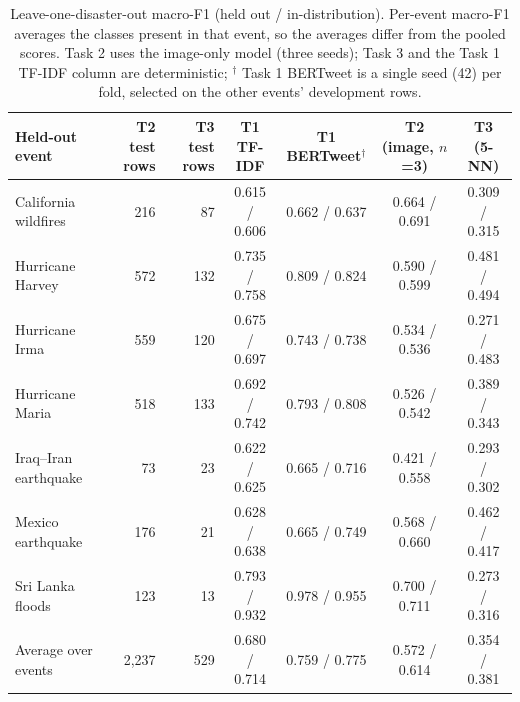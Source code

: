 \documentclass[conference]{IEEEtran}
\begin{document}
\begin{table}[t]
\centering
\caption{Leave-one-disaster-out macro-F1 (held out / in-distribution). Per-event macro-F1 averages the classes present in that event, so the averages differ from the pooled scores. Task 2 uses the image-only model (three seeds); Task 3 and the Task 1 TF-IDF column are deterministic; $^{\dagger}$ Task 1 BERTweet is a single seed (42) per fold, selected on the other events' development rows.}
\label{tab:lodo}
\footnotesize
\begin{tabular}{lrrcccc}
\toprule
Held-out event & T2 test rows & T3 test rows & T1 TF-IDF & T1 BERTweet$^{\dagger}$ & T2 (image, $n$=3) & T3 (5-NN) \\
\midrule
California wildfires & 216 & 87 & 0.615 / 0.606 & 0.662 / 0.637 & 0.664 / 0.691 & 0.309 / 0.315 \\
Hurricane Harvey & 572 & 132 & 0.735 / 0.758 & 0.809 / 0.824 & 0.590 / 0.599 & 0.481 / 0.494 \\
Hurricane Irma & 559 & 120 & 0.675 / 0.697 & 0.743 / 0.738 & 0.534 / 0.536 & 0.271 / 0.483 \\
Hurricane Maria & 518 & 133 & 0.692 / 0.742 & 0.793 / 0.808 & 0.526 / 0.542 & 0.389 / 0.343 \\
Iraq--Iran earthquake & 73 & 23 & 0.622 / 0.625 & 0.665 / 0.716 & 0.421 / 0.558 & 0.293 / 0.302 \\
Mexico earthquake & 176 & 21 & 0.628 / 0.638 & 0.665 / 0.749 & 0.568 / 0.660 & 0.462 / 0.417 \\
Sri Lanka floods & 123 & 13 & 0.793 / 0.932 & 0.978 / 0.955 & 0.700 / 0.711 & 0.273 / 0.316 \\
\midrule
Average over events & 2,237 & 529 & 0.680 / 0.714 & 0.759 / 0.775 & 0.572 / 0.614 & 0.354 / 0.381 \\
\bottomrule
\end{tabular}
\end{table}
\end{document}
